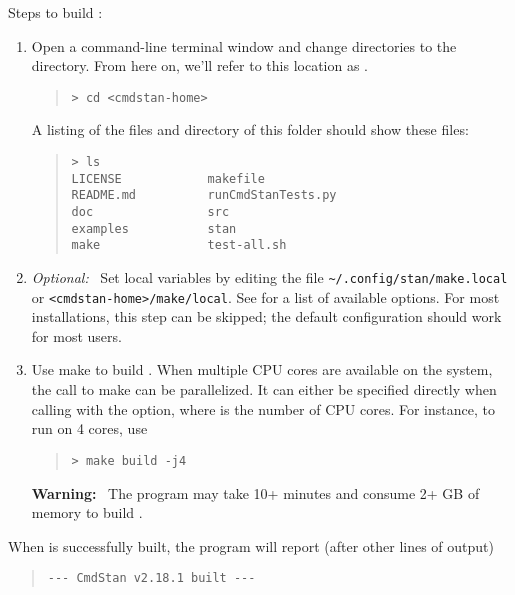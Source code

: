 Steps to build \CmdStan:
%
\begin{enumerate}
  \item Open a command-line terminal window and change directories to
    the \CmdStan directory. From here on, we'll refer to this location as
    .
    \begin{quote}
      \begin{Verbatim}[fontshape=sl]
> cd <cmdstan-home>
      \end{Verbatim}
    \end{quote}
    \noindent
    A listing of the files and directory of this folder should show these files:
    \begin{quote}
      \begin{Verbatim}
> ls
LICENSE            makefile
README.md          runCmdStanTests.py
doc                src
examples           stan
make               test-all.sh
      \end{Verbatim}
    \end{quote}
  \item \emph{Optional:} \, Set local  variables by editing
    the file \verb+~/.config/stan/make.local+ or
    \verb+<cmdstan-home>/make/local+. See 
    for a list of available options.  For most installations, this
    step can be skipped; the default configuration should work for
    most users.
  \item Use make to build \CmdStan. When multiple CPU cores are
    available on the system, the call to make can be parallelized.  It
    can either be specified directly when calling  with the
     option, where  is the
    number of CPU cores. For instance, to run on 4 cores, use
    \begin{quote}
      \begin{Verbatim}[fontshape=sl]
> make build -j4
      \end{Verbatim}
    \end{quote}
    \textbf{Warning:} \ The  program may take 10+ minutes and
    consume 2+ GB of memory to build \CmdStan.
\end{enumerate}
%
When \CmdStan is successfully built, the  program will
report (after other lines of output)
%
\begin{quote}
  \begin{Verbatim}
--- CmdStan v2.18.1 built ---
  \end{Verbatim}
\end{quote}

